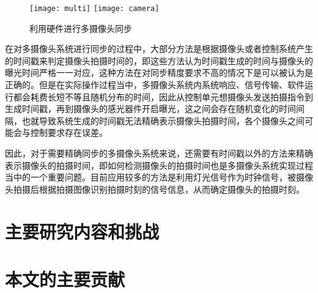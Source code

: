 \begin{figure}[h]
  \centering%
    {\texttt{[image: multi]}}
    \hspace{4em}%
      {\texttt{[image: camera]}}
  \caption{利用硬件进行多摄像头同步}
\end{figure}

在对多摄像头系统进行同步的过程中，大部分方法是根据摄像头或者控制系统产生的时间戳来判定摄像头拍摄时间的，即这些方法认为时间戳生成的时间与摄像头的曝光时间严格一一对应，这种方法在对同步精度要求不高的情况下是可以被认为是正确的。但是在实际操作过程当中，多摄像头系统内系统响应、信号传输、软件运行都会耗费长短不等且随机分布的时间，因此从控制单元想摄像头发送拍摄指令到生成时间戳，再到摄像头的感光器件开启曝光，这之间会存在随机变化的时间间隔，也就导致系统生成的时间戳无法精确表示摄像头拍摄时间，各个摄像头之间可能会与控制要求存在误差。

因此，对于需要精确同步的多摄像头系统来说，还需要有时间戳以外的方法来精确表示摄像头的拍摄时间，即如何检测摄像头的拍摄时间也是多摄像头系统实现过程当中的一个重要问题。目前应用较多的方法是利用灯光信号作为时钟信号，被摄像头拍摄后根据拍摄图像识别拍摄时刻的信号信息，从而确定摄像头的拍摄时刻。

\section{主要研究内容和挑战}


\section{本文的主要贡献}








































